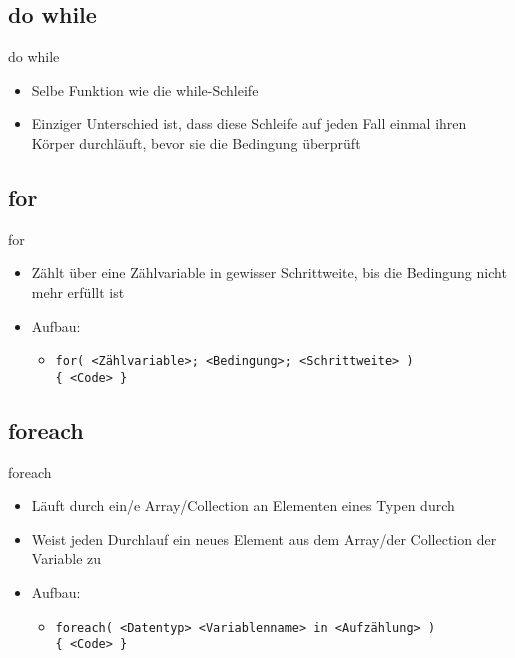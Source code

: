 \subsection{do while}
\begin{frame}{do while}
	\begin{itemize}
		\item Selbe Funktion wie die while-Schleife
		\item Einziger Unterschied ist, dass diese Schleife auf jeden Fall einmal ihren Körper durchläuft, bevor sie die Bedingung überprüft
	\end{itemize}
		
\end{frame}

\subsection{for}
\begin{frame}{for}
	\begin{itemize}
		\item Zählt über eine Zählvariable in gewisser Schrittweite, bis die Bedingung nicht mehr erfüllt ist
		\item Aufbau:
		\begin{itemize}
			\item \texttt{for( \alert{<Zählvariable>}; \alert{<Bedingung>}; \alert{<Schrittweite>} )\\ \{ \alert{<Code>} \}}
		\end{itemize}
	\end{itemize}
		
\end{frame}

\subsection{foreach}
\begin{frame}{foreach}
	\begin{itemize}
		\item Läuft durch ein/e Array/Collection an Elementen eines Typen durch 
		\item Weist jeden Durchlauf ein neues Element aus dem Array/der Collection der Variable zu 
		\item Aufbau:
		\begin{itemize}
			\item \texttt{foreach( \alert{<Datentyp> <Variablenname>} in \alert{<Aufzählung>} )\\ \{ \alert{<Code>} \}}
		\end{itemize}
	\end{itemize}
		
\end{frame}

